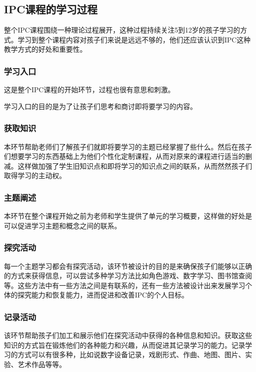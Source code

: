 \subsection{IPC课程的学习过程}
     整个IPC课程围绕一种理论过程展开，这种过程持续关注5到12岁的孩子学习的方式。学习到整个课程内容对孩子们来说是远远不够的，他们还应该认识到IPC这种教学方式的好处和重要性。 \par
     

\subsubsection{学习入口}
    这是整个IPC课程的开始环节，过程也很有意思和刺激。 \par
    学习入口的目的是为了让孩子们思考和商讨即将要学习的内容。

\subsubsection{获取知识}
    本环节帮助老师们了解孩子们就即将要学习的主题已经掌握了些什么。然后在孩子们想要学习的东西基础上为他们个性化定制课程，从而对原来的课程进行适当的删减。这样做加强了学生旧知识点和即将学习的知识点之间的联系，从而然然孩子们取得学习的主动权。\par

\subsubsection{主题阐述}
    本环节在整个课程开始之前为老师和学生提供了单元的学习概要，这样做的好处是可以促进学习主题和概念之间的联系。\par

\subsubsection{探究活动}
    每一个主题学习都会有探究活动，该环节被设计的目的是来确保孩子们能够以正确的方式来获得信息，可以尝试多种学习方法比如角色游戏、数字学习、图书馆查阅等。这些方法中有一些方法之间是有联系的，还有一些方法被设计出来发展学习个体的探究能力和恢复能力，进而促进和改善IPC的个人目标。

\subsubsection{记录活动}
    该环节帮助孩子们加工和展示他们在探究活动中获得的各种信息和知识。获取这些知识的方式旨在锻炼他们的各种能力和兴趣，从而促进其记录学习的能力。记录学习的方式可以有很多种，比如说数字设备记录，戏剧形式、作曲、地图、图片、实验、艺术作品等等。

